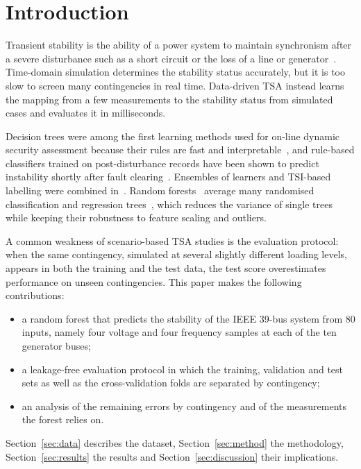\documentclass[conference]{IEEEtran}
\begin{document}
\section{Introduction}
Transient stability is the ability of a power system to maintain synchronism after a severe disturbance such as a
short circuit or the loss of a line or generator~\cite{kundur2004}. Time-domain simulation determines the stability
status accurately, but it is too slow to screen many contingencies in real time. Data-driven TSA instead learns the
mapping from a few measurements to the stability status from simulated cases and evaluates it in milliseconds.

Decision trees were among the first learning methods used for on-line dynamic security assessment because their
rules are fast and interpretable~\cite{sun2007}, and rule-based classifiers trained on post-disturbance records have
been shown to predict instability shortly after fault clearing~\cite{kamwa2009}. Ensembles of learners and TSI-based
labelling were combined in~\cite{xu2012}. Random forests~\cite{breiman2001} average many randomised classification
and regression trees~\cite{breiman1984}, which reduces the variance of single trees while keeping their robustness to
feature scaling and outliers.

A common weakness of scenario-based TSA studies is the evaluation protocol: when the same contingency, simulated at
several slightly different loading levels, appears in both the training and the test data, the test score
overestimates performance on unseen contingencies. This paper makes the following contributions:
\begin{itemize}
  \item a random forest that predicts the stability of the IEEE 39-bus system from 80 inputs, namely four voltage and
        four frequency samples at each of the ten generator buses;
  \item a leakage-free evaluation protocol in which the training, validation and test sets as well as the
        cross-validation folds are separated by contingency;
  \item an analysis of the remaining errors by contingency and of the measurements the forest relies on.
\end{itemize}
Section~\ref{sec:data} describes the dataset, Section~\ref{sec:method} the methodology, Section~\ref{sec:results} the
results and Section~\ref{sec:discussion} their implications.
\end{document}
